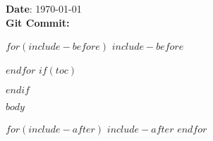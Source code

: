 \documentclass[10pt,openright]{$documentclass$}
\date{$date$}
\begin{document}




\textbf{Date}: \today \\
\textbf{Git Commit:} \texttt{}

\newpage


$for(include-before)$
$include-before$

$endfor$
$if(toc)$
{
\setcounter{tocdepth}{$toc-depth$}
\tableofcontents

\newpage

}
$endif$


$body$


$for(include-after)$
$include-after$
$endfor$


\newpage


\end{document}
